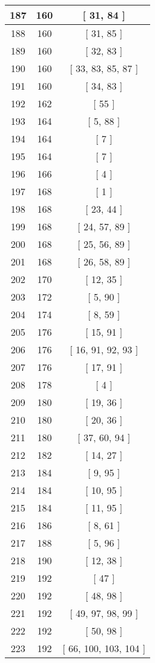 \begin{center}
\begin{longtable}[H]{|| c c c ||}
187 & 160 & [ 31, 84 ]
\\\hline
188 & 160 & [ 31, 85 ]
\\\hline
189 & 160 & [ 32, 83 ]
\\\hline
190 & 160 & [ 33, 83, 85, 87 ]
\\\hline
191 & 160 & [ 34, 83 ]
\\\hline
192 & 162 & [ 55 ]
\\\hline
193 & 164 & [ 5, 88 ]
\\\hline
194 & 164 & [ 7 ]
\\\hline
195 & 164 & [ 7 ]
\\\hline
196 & 166 & [ 4 ]
\\\hline
197 & 168 & [ 1 ]
\\\hline
198 & 168 & [ 23, 44 ]
\\\hline
199 & 168 & [ 24, 57, 89 ]
\\\hline
200 & 168 & [ 25, 56, 89 ]
\\\hline
201 & 168 & [ 26, 58, 89 ]
\\\hline
202 & 170 & [ 12, 35 ]
\\\hline
203 & 172 & [ 5, 90 ]
\\\hline
204 & 174 & [ 8, 59 ]
\\\hline
205 & 176 & [ 15, 91 ]
\\\hline
206 & 176 & [ 16, 91, 92, 93 ]
\\\hline
207 & 176 & [ 17, 91 ]
\\\hline
208 & 178 & [ 4 ]
\\\hline
209 & 180 & [ 19, 36 ]
\\\hline
210 & 180 & [ 20, 36 ]
\\\hline
211 & 180 & [ 37, 60, 94 ]
\\\hline
212 & 182 & [ 14, 27 ]
\\\hline
213 & 184 & [ 9, 95 ]
\\\hline
214 & 184 & [ 10, 95 ]
\\\hline
215 & 184 & [ 11, 95 ]
\\\hline
216 & 186 & [ 8, 61 ]
\\\hline
217 & 188 & [ 5, 96 ]
\\\hline
218 & 190 & [ 12, 38 ]
\\\hline
219 & 192 & [ 47 ]
\\\hline
220 & 192 & [ 48, 98 ]
\\\hline
221 & 192 & [ 49, 97, 98, 99 ]
\\\hline
222 & 192 & [ 50, 98 ]
\\\hline
223 & 192 & [ 66, 100, 103, 104 ]

\end{longtable}
\end{center}

